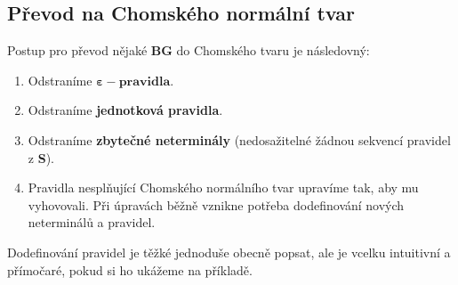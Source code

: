 \documentclass{report}
\begin{document}
\subsection*{Převod na Chomského normální tvar}
Postup pro převod nějaké \textbf{BG} do Chomského tvaru je následovný:
\begin{enumerate}
    \item Odstraníme $\mathbf{\varepsilon-pravidla}$.
    \item Odstraníme \textbf{jednotková pravidla}.
    \item Odstraníme \textbf{zbytečné neterminály} (nedosažitelné žádnou sekvencí pravidel z \textbf{S}).
    \item Pravidla nesplňující Chomského normálního tvar upravíme tak, aby mu vyhovovali. Při úpravách běžně vznikne potřeba dodefinování nových neterminálů a pravidel. 
\end{enumerate}
Dodefinování pravidel je těžké jednoduše obecně popsat, ale je vcelku intuitivní a přímočaré, pokud si ho ukážeme na příkladě.
\pagebreak
\end{document}
